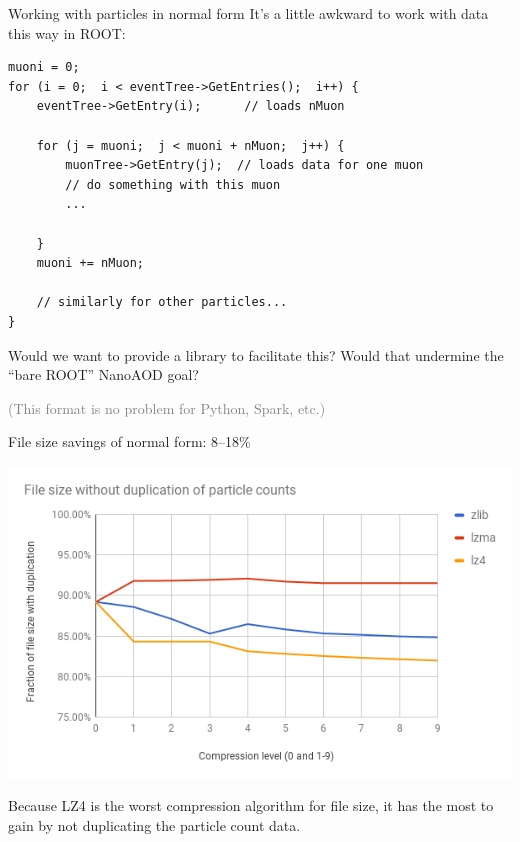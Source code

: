 \documentclass{beamer}
\begin{document}
\begin{frame}[fragile]{Working with particles in normal form}
\vspace{0.5 cm}
It's a little awkward to work with data this way in ROOT:

\vspace{0.25 cm}
\scriptsize
\begin{verbatim}
muoni = 0;
for (i = 0;  i < eventTree->GetEntries();  i++) {
    eventTree->GetEntry(i);      // loads nMuon

    for (j = muoni;  j < muoni + nMuon;  j++) {
        muonTree->GetEntry(j);  // loads data for one muon
        // do something with this muon
        ...

    }
    muoni += nMuon;

    // similarly for other particles...
}
\end{verbatim}

\vspace{0.25 cm}
\normalsize
Would we want to provide a library to facilitate this? Would that undermine the ``bare ROOT'' NanoAOD goal?

\vspace{0.25 cm}
\textcolor{gray}{(This format is no problem for Python, Spark, etc.)}
\end{frame}

\begin{frame}{File size savings of normal form: 8--18\%}
\begin{center}
\includegraphics[width=\linewidth]{avoiding-duplication.png}
\end{center}

Because LZ4 is the worst compression algorithm for file size, it has the most to gain by not duplicating the particle count data.
\end{frame}
\end{document}
